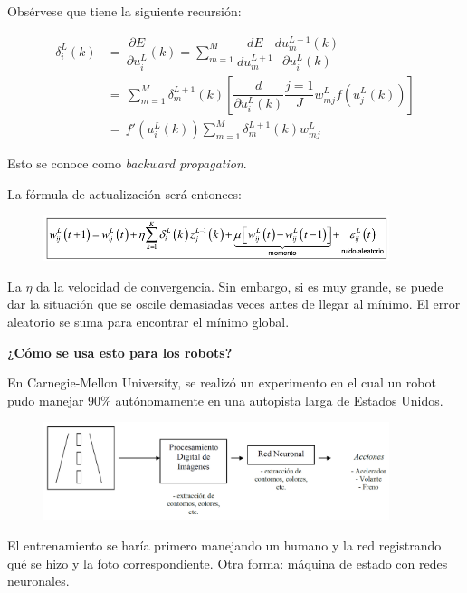 Obsérvese que tiene la siguiente recursión:


\begin{equation*}
	\begin{aligned}
		 \delta_i^L (k) & = \, \dfrac{\partial E}{\partial u_{i}^L }(k) = \sum_{m=1}^{M} \dfrac{dE}{du_m^{L+1}} \dfrac{du_m^{L+1} (k)}{\partial u_i^L (k)}  \\
		& = \,\sum_{m=1}^{M} \delta_m^{L+1} (k) \left[ \dfrac{d}{\partial u_i^L (k)} \dfrac{j=1}{J} w_{mj}^L f (u_j^L (k)) \right] \\
		& = \, f'(u_i^L(k)) \sum_{m=1}^{M} \delta_m^{L+1} (k) w_{mj}^L 
	\end{aligned}
\end{equation*}

Esto se conoce como \textit{backward propagation}.

La fórmula de actualización será entonces:
\begin{figure}[h!]
	\centering
	\includegraphics[width=0.9\textwidth]{images/img79_f.png}
	\label{figura79_f}
\end{figure}

La $\eta$ da la velocidad de convergencia. Sin embargo, si es muy grande, se puede dar la situación que se oscile
demasiadas veces antes de llegar al mínimo.
El error aleatorio se suma para encontrar el mínimo global.

\textbf{¿Cómo se usa esto para los robots?}

En Carnegie-Mellon University, se realizó un experimento en el cual un robot pudo manejar 90\% autónomamente en una autopista larga de Estados Unidos.

\begin{figure}[h!]
	\centering
	\includegraphics[width=0.9\textwidth]{images/img80.png}
	\label{figura80}
\end{figure}

El entrenamiento se haría primero manejando un humano y la red registrando qué se hizo y la foto
correspondiente.
Otra forma: máquina de estado con redes neuronales.

